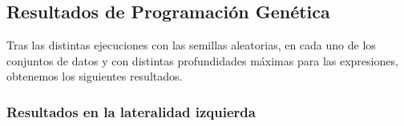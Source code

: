 \newpage

\subsection{Resultados de Programación Genética}

Tras las distintas ejecuciones con las semillas aleatorias, en cada uno de los conjuntos de datos y con distintas profundidades máximas para las expresiones, obtenemos los siguientes resultados.


\subsubsection{Resultados en la lateralidad izquierda}


